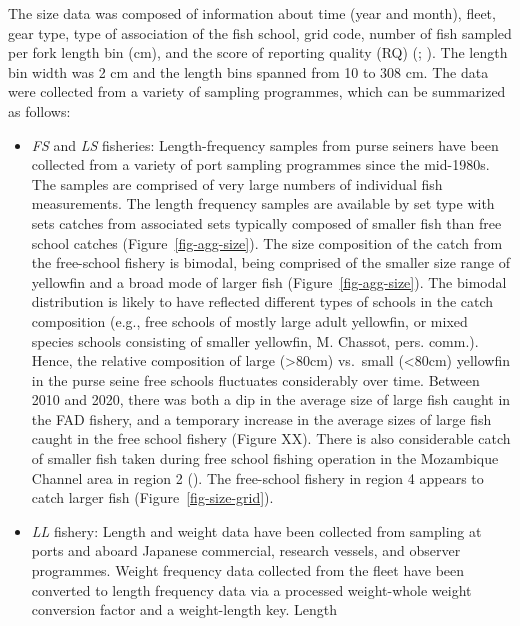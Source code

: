 \documentclass[
]{scrartcl}
\begin{document}
The size data was composed of information about time (year and month),
fleet, gear type, type of association of the fish school, grid code,
number of fish sampled per fork length bin (cm), and the score of
reporting quality (RQ)
(;
). The length bin
width was 2 cm and the length bins spanned from 10 to 308 cm. The data
were collected from a variety of sampling programmes, which can be
summarized as follows:

\begin{itemize}
\item
  \emph{FS} and \emph{LS} fisheries: Length-frequency samples from purse
  seiners have been collected from a variety of port sampling programmes
  since the mid-1980s. The samples are comprised of very large numbers
  of individual fish measurements. The length frequency samples are
  available by set type with sets catches from associated sets typically
  composed of smaller fish than free school catches
  (Figure~\ref{fig-agg-size}). The size composition of the catch from
  the free-school fishery is bimodal, being comprised of the smaller
  size range of yellowfin and a broad mode of larger fish
  (Figure~\ref{fig-agg-size}). The bimodal distribution is likely to
  have reflected different types of schools in the catch composition
  (e.g., free schools of mostly large adult yellowfin, or mixed species
  schools consisting of smaller yellowfin, M. Chassot, pers. comm.).
  Hence, the relative composition of large (\textgreater80cm) vs.~small
  (\textless80cm) yellowfin in the purse seine free schools fluctuates
  considerably over time. Between 2010 and 2020, there was both a dip in
  the average size of large fish caught in the FAD fishery, and a
  temporary increase in the average sizes of large fish caught in the
  free school fishery (Figure XX). There is also considerable catch of
  smaller fish taken during free school fishing operation in the
  Mozambique Channel area in region 2
  (). The
  free-school fishery in region 4 appears to catch larger fish
  (Figure~\ref{fig-size-grid}).
\item
  \emph{LL} fishery: Length and weight data have been collected from
  sampling at ports and aboard Japanese commercial, research vessels,
  and observer programmes. Weight frequency data collected from the
  fleet have been converted to length frequency data via a processed
  weight-whole weight conversion factor and a weight-length key. Length

\end{itemize}
\end{document}
